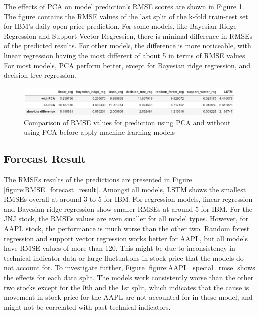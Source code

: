 \documentclass[conference]{IEEEtran}
\begin{document}
The effects of PCA on model prediction's RMSE scores are shown in Figure \ref{figure:pca_no_pca}. The figure contains the RMSE values of the last split of the k-fold train-test set for IBM's daily open price prediction. For some models, like Bayesian Ridge Regression and Support Vector Regression, there is minimal difference in RMSEs of the predicted results. For other models, the difference is more noticeable, with linear regression having the most different of about 5 in terms of RMSE values. For most models, PCA perform better, except for Bayesian ridge regression, and decision tree regression. 

\begin{figure}
  \includegraphics[width=\linewidth]{./image/pca_no_pca.PNG}
  \caption{Comparison of RMSE values for prediction using PCA and without using PCA before apply machine learning models}
  \label{figure:pca_no_pca}
\end{figure}

\subsection{Forecast Result}
\label{subsection:forecast result}
The RMSEs results of the predictions are presented in Figure \ref{figure:RMSE_forecast_result}. Amongst all models, LSTM shows the smallest RMSEs overall at around 3 to 5 for IBM. For regression models, linear regression and Bayesian ridge regression show smaller RMSEs at around 5 for IBM. For the JNJ stock, the RMSEs values are even smaller for all model types. However, for AAPL stock, the performance is much worse than the other two. Random forest regression and support vector regression works better for AAPL, but all models have RMSE values of more than 120. This might be due to inconsistency in technical indicator data or large fluctuations in stock price that the models do not account for. To investigate further, Figure \ref{figure:AAPL_special_rmse} shows the effects for each data split. The models work consistently worse than the other two stocks except for the 0th and the 1st split, which indicates that the cause is movement in stock price for the AAPL are not accounted for in these model, and might not be correlated with past technical indicators.
\end{document}
